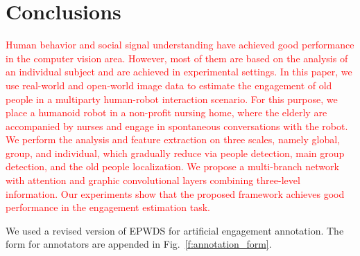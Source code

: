 \documentclass[10pt,journal,compsoc]{IEEEtran}
\begin{document}
\section{Conclusions}
\label{s:Conclusions}

\textcolor{red}{Human behavior and social signal understanding have achieved good performance in the computer vision area. However, most of them are based on the analysis of an individual subject and are achieved in experimental settings. In this paper, we use real-world and open-world image data to estimate the engagement of old people in a multiparty human-robot interaction scenario. For this purpose, we place a humanoid robot in a non-profit nursing home, where the elderly are accompanied by nurses and engage in spontaneous conversations with the robot. We perform the analysis and feature extraction on three scales, namely global, group, and individual, which gradually reduce via people detection, main group detection, and the old people localization. We propose a multi-branch network with attention and graphic convolutional layers combining three-level information. Our experiments show that the proposed framework achieves good performance in the engagement estimation task.}

\appendix
\label{ap:annotation_form}

We used a revised version of EPWDS for artificial engagement annotation. The form for annotators are appended in Fig.~\ref{f:annotation_form}.
\end{document}
